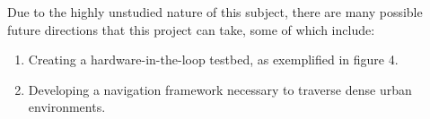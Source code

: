 Due to the highly unstudied nature of this subject, there are many possible future directions that this project can take, some of which include:

\begin{enumerate}
\item{Creating a hardware-in-the-loop testbed, as exemplified in figure 4.}

\item{Developing a navigation framework necessary to traverse dense urban environments.}

\end{enumerate}
